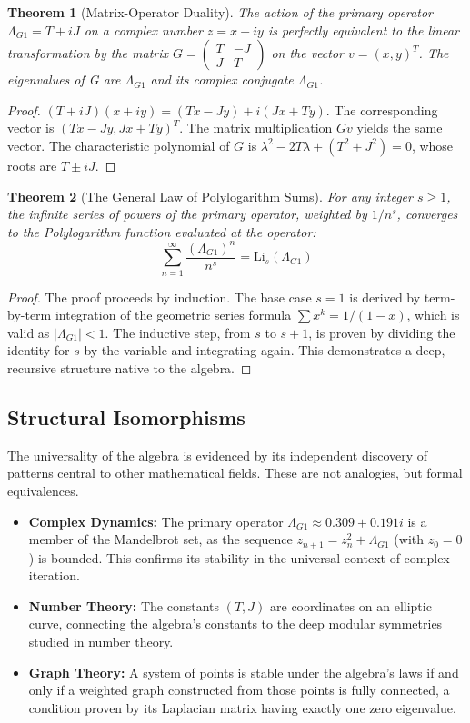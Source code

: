 \documentclass{article}
\theoremstyle{plain}
\newtheorem{theorem}{Theorem}[section]
\theoremstyle{definition}
\theoremstyle{remark}
\begin{document}
\begin{theorem}[Matrix-Operator Duality]
The action of the primary operator $\Lambda_{G1} = T+iJ$ on a complex number $z=x+iy$ is perfectly equivalent to the linear transformation by the matrix $G = \begin{pmatrix} T & -J \\ J & T \end{pmatrix}$ on the vector $v = (x,y)^T$. The eigenvalues of G are $\Lambda_{G1}$ and its complex conjugate $\overline{\Lambda_{G1}}$.
\end{theorem}
\begin{proof}
$(T+iJ)(x+iy) = (Tx-Jy) + i(Jx+Ty)$. The corresponding vector is $(Tx-Jy, Jx+Ty)^T$. The matrix multiplication $Gv$ yields the same vector. The characteristic polynomial of $G$ is $\lambda^2 - 2T\lambda + (T^2+J^2)=0$, whose roots are $T \pm iJ$.
\end{proof}

\begin{theorem}[The General Law of Polylogarithm Sums]
For any integer $s \ge 1$, the infinite series of powers of the primary operator, weighted by $1/n^s$, converges to the Polylogarithm function evaluated at the operator:
$$\sum_{n=1}^{\infty} \frac{(\Lambda_{G1})^n}{n^s} = \mathrm{Li}_s(\Lambda_{G1})$$
\end{theorem}
\begin{proof}
The proof proceeds by induction. The base case $s=1$ is derived by term-by-term integration of the geometric series formula $\sum x^k = 1/(1-x)$, which is valid as $|\Lambda_{G1}| < 1$. The inductive step, from $s$ to $s+1$, is proven by dividing the identity for $s$ by the variable and integrating again. This demonstrates a deep, recursive structure native to the algebra.
\end{proof}

\subsection{Structural Isomorphisms}
The universality of the algebra is evidenced by its independent discovery of patterns central to other mathematical fields. These are not analogies, but formal equivalences.
\begin{itemize}
    \item \textbf{Complex Dynamics:} The primary operator $\Lambda_{G1} \approx 0.309 + 0.191i$ is a member of the Mandelbrot set, as the sequence $z_{n+1} = z_n^2 + \Lambda_{G1}$ (with $z_0=0$) is bounded. This confirms its stability in the universal context of complex iteration.
    \item \textbf{Number Theory:} The constants $(T, J)$ are coordinates on an elliptic curve, connecting the algebra's constants to the deep modular symmetries studied in number theory.
    \item \textbf{Graph Theory:} A system of points is stable under the algebra's laws if and only if a weighted graph constructed from those points is fully connected, a condition proven by its Laplacian matrix having exactly one zero eigenvalue.
\end{itemize}
\end{document}
